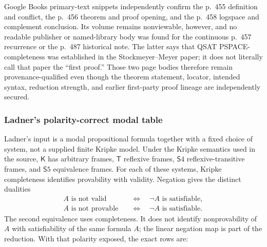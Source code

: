 Google Books primary-text snippets independently confirm the p.~455 definition
and conflict, the p.~456 theorem and proof opening, and the p.~458 logspace and
complement conclusion.  Its volume remains nonviewable, however, and no
readable publisher or named-library body was found for the continuous p.~457
recurrence or the p.~487 historical note.  The latter says that QSAT
PSPACE-completeness was established in the Stockmeyer--Meyer paper; it does not
literally call that paper the ``first proof.''  Those two page bodies therefore
remain provenance-qualified even though the theorem statement, locator,
intended syntax, reduction strength, and earlier first-party proof lineage are
independently secured.

\subsubsection{Ladner's polarity-correct modal table}

Ladner's input is a modal propositional formula together with a fixed choice of
system, not a supplied finite Kripke model.  Under the Kripke semantics used in
the source, \(\mathsf K\) has arbitrary frames, \(\mathsf T\) reflexive frames,
\(\mathsf S4\) reflexive-transitive frames, and \(\mathsf S5\) equivalence
frames.  For each of these systems, Kripke completeness identifies provability
with validity.  Negation gives the distinct dualities
\[
 \begin{aligned}
  A\text{ is not valid}
    &\quad\Longleftrightarrow\quad \neg A\text{ is satisfiable},\\
  A\text{ is not provable}
    &\quad\Longleftrightarrow\quad \neg A\text{ is satisfiable}.
 \end{aligned}
\]
The second equivalence uses completeness.  It does not identify nonprovability
of \(A\) with satisfiability of the same formula \(A\); the linear negation map
is part of the reduction.  With that polarity exposed, the exact rows are:

